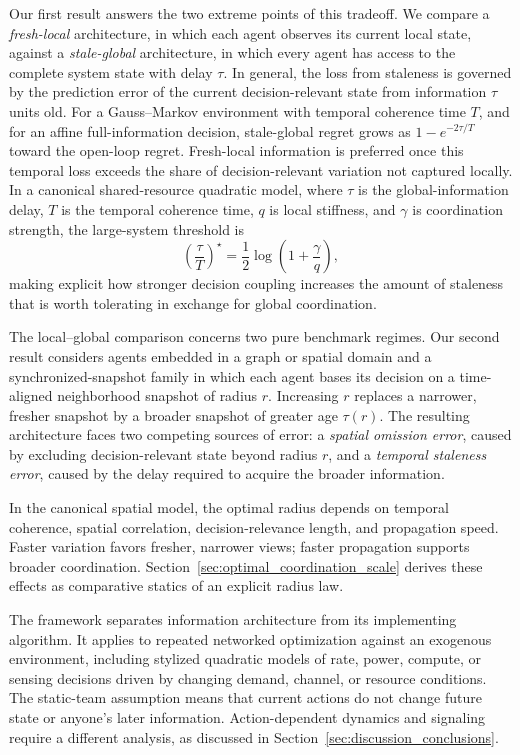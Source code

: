 \documentclass[11pt]{article}
\begin{document}
Our first result answers the two extreme points of this tradeoff. We compare a
\emph{fresh-local} architecture, in which each agent observes its current local
state, against a \emph{stale-global} architecture, in which every agent has
access to the complete system state with delay $\tau$. In general, the loss
from staleness is governed by the prediction error of the current
decision-relevant state from information $\tau$ units old. For a
Gauss--Markov environment with temporal coherence time $T$, and for an affine
full-information decision, stale-global regret grows as
$1-e^{-2\tau/T}$ toward the open-loop regret. Fresh-local information is
preferred once this temporal loss exceeds the share of decision-relevant
variation not captured locally. In a canonical shared-resource quadratic
model, where $\tau$ is the global-information delay, $T$ is the temporal
coherence time, $q$ is local stiffness, and $\gamma$ is coordination strength,
the large-system threshold is
\begin{equation}
    \left(\frac{\tau}{T}\right)^\star
    =
    \frac{1}{2}\log\left(1+\frac{\gamma}{q}\right),
    \label{eq:intro_coupling}
\end{equation}
making explicit how stronger decision coupling increases the amount of
staleness that is worth tolerating in exchange for global coordination.

The local--global comparison concerns two pure benchmark regimes. Our second
result considers agents embedded in a graph or spatial domain and a
synchronized-snapshot family in which each agent bases its decision on a
time-aligned neighborhood snapshot of radius $r$. Increasing $r$ replaces a
narrower, fresher snapshot by a broader snapshot of greater age $\tau(r)$.
The resulting architecture faces two
competing sources of error: a \emph{spatial omission error}, caused by
excluding decision-relevant state beyond radius $r$, and a
\emph{temporal staleness error}, caused by the delay required to acquire the
broader information.

In the canonical spatial model, the optimal radius depends on temporal
coherence, spatial correlation, decision-relevance length, and propagation
speed. Faster variation favors fresher, narrower views; faster propagation
supports broader coordination. Section~\ref{sec:optimal_coordination_scale}
derives these effects as comparative statics of an explicit radius law.

The framework separates information architecture from its implementing
algorithm. It applies to repeated networked optimization against an exogenous
environment, including stylized quadratic models of rate, power, compute, or
sensing decisions driven by changing demand, channel, or resource conditions.
The static-team assumption means that current actions do not change future
state or anyone's later information. Action-dependent dynamics and signaling
require a different analysis, as discussed in Section~\ref{sec:discussion_conclusions}.
\end{document}
